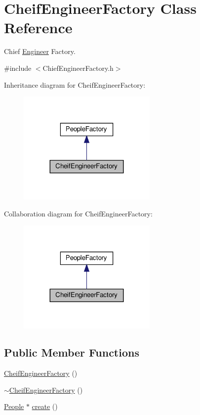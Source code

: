 \hypertarget{classCheifEngineerFactory}{}\section{Cheif\+Engineer\+Factory Class Reference}
\label{classCheifEngineerFactory}


Chief \hyperlink{classEngineer}{Engineer} Factory.  




{\ttfamily \#include $<$Chief\+Engineer\+Factory.\+h$>$}



Inheritance diagram for Cheif\+Engineer\+Factory\+:\nopagebreak
\begin{figure}[H]
\begin{center}
\leavevmode
\includegraphics[width=191pt]{classCheifEngineerFactory__inherit__graph}
\end{center}
\end{figure}


Collaboration diagram for Cheif\+Engineer\+Factory\+:\nopagebreak
\begin{figure}[H]
\begin{center}
\leavevmode
\includegraphics[width=191pt]{classCheifEngineerFactory__coll__graph}
\end{center}
\end{figure}
\subsection*{Public Member Functions}
\begin{DoxyCompactItemize}
\item 
\hyperlink{classCheifEngineerFactory_aa3b45f6d06a640bc77086f58ccffe650}{Cheif\+Engineer\+Factory} ()
\item 
\hyperlink{classCheifEngineerFactory_ac6c5623874406c88cd34badb6294c998}{$\sim$\+Cheif\+Engineer\+Factory} ()
\item 
\hyperlink{classPeople}{People} $\ast$ \hyperlink{classCheifEngineerFactory_a3a593a010ee16ec52670601e0c5c72d5}{create} ()
\end{DoxyCompactItemize}


